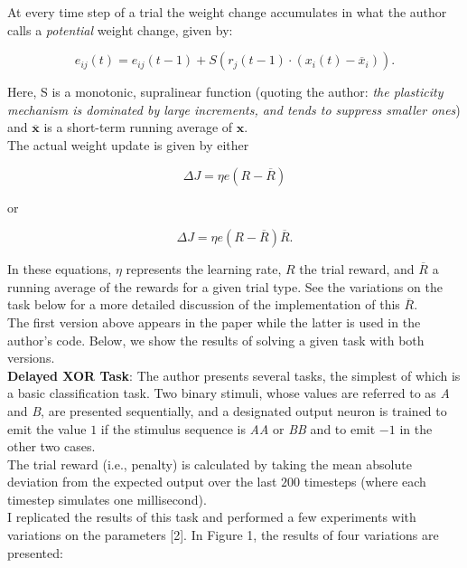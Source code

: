 \documentclass{article}
\theoremstyle{plain}
\theoremstyle{definition}
\theoremstyle{remark}
\begin{document}
At every time step of a trial the weight change accumulates in what the author calls a \textit{potential} weight change, given by:

$$
e_{ij}(t) = e_{ij}(t-1) + S(r_j(t-1) \cdot (x_i(t)-\overline{x}_i)).
$$

Here, S is a monotonic, supralinear function (quoting the author: \textit{the plasticity mechanism is dominated by large increments, and tends to suppress smaller ones}) and $\overline{\mathbf{x}}$ is a short-term running average of $\mathbf{x}$. \\

The actual weight update is given by either

$$
\Delta J = \eta e (R - \overline{R})
$$

or

$$
\Delta J = \eta e (R - \overline{R}) \overline{R}.
$$

In these equations, $\eta$ represents the learning rate, $R$ the trial reward, and $\overline{R}$ a running average of the rewards for a given trial type. See the variations on the task below for a more detailed discussion of the implementation of this $\overline{R}$. \\

The first version above appears in the paper while the latter is used in the author's code. Below, we show the results of solving a given task with both versions. \\

\textbf{Delayed XOR Task}: The author presents several tasks, the simplest of which is a basic classification task. Two binary stimuli, whose values are referred to as \textit{A} and \textit{B}, are presented sequentially, and a designated output neuron is trained to emit the value $1$ if the stimulus sequence is \textit{AA} or \textit{BB} and to emit $-1$ in the other two cases. \\

The trial reward (i.e., penalty) is calculated by taking the mean absolute deviation from the expected output over the last $200$ timesteps (where each timestep simulates one millisecond). \\

I replicated the results of this task and performed a few experiments with variations on the parameters [2]. In Figure 1, the results of four variations are presented: \\
\end{document}
